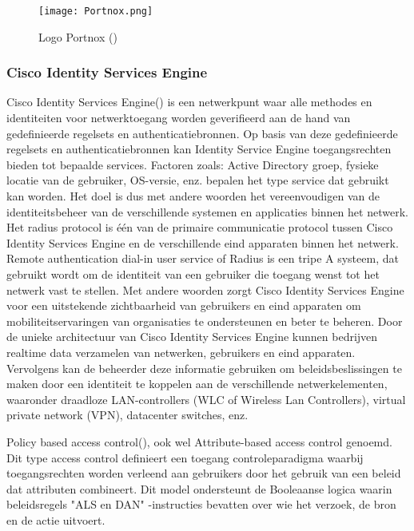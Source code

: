 \begin{figure}[H]
	\centering
	\texttt{[image: Portnox.png]}
	\caption{Logo Portnox (\cite{PortnoxLogo})}
	\label{fig:Portnox}
\end{figure}

\subsubsection{\bf Cisco Identity Services Engine}
Cisco Identity Services Engine(\cite{ISE}) is een netwerkpunt waar alle methodes en identiteiten voor netwerktoegang worden geverifieerd aan de hand van gedefinieerde regelsets en authenticatiebronnen. Op basis van deze gedefinieerde regelsets en authenticatiebronnen kan Identity Service Engine toegangsrechten bieden tot bepaalde services. Factoren zoals: Active Directory groep, fysieke locatie van de gebruiker, OS-versie, enz. bepalen het type service dat gebruikt kan worden. Het doel is dus met andere woorden het vereenvoudigen van de identiteitsbeheer van de verschillende systemen en applicaties binnen het netwerk.
\newline
\newline   
Het radius protocol is één van de primaire communicatie protocol tussen Cisco Identity Services Engine en de verschillende eind apparaten binnen het netwerk.
\newline
\newline 
Remote authentication dial-in user service of Radius is een tripe A systeem, dat gebruikt wordt om de identiteit van een gebruiker die toegang wenst tot het netwerk vast te stellen. Met andere woorden zorgt Cisco Identity Services Engine voor een uitstekende zichtbaarheid van gebruikers en eind apparaten om mobiliteitservaringen van organisaties te ondersteunen en beter te beheren.
\newline
\newline
Door de unieke architectuur van Cisco Identity Services Engine kunnen bedrijven realtime data verzamelen van netwerken, gebruikers en eind apparaten. Vervolgens kan de beheerder deze informatie gebruiken om beleidsbeslissingen te maken door een identiteit te koppelen aan de verschillende netwerkelementen, waaronder draadloze LAN-controllers (WLC of Wireless Lan Controllers), virtual private network (VPN), datacenter switches, enz. 

\newpage
{}
\newline
Policy based access control(\cite{ABAC}), ook wel Attribute-based access control genoemd. Dit type access control definieert een toegang controleparadigma waarbij toegangsrechten worden verleend aan gebruikers door het gebruik van een beleid dat attributen combineert. Dit model ondersteunt de Booleaanse logica waarin beleidsregels "ALS en DAN" -instructies bevatten over wie het verzoek, de bron en de actie uitvoert.

